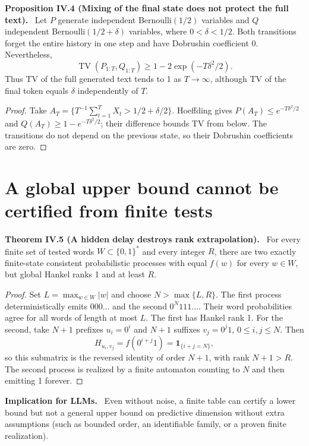 \documentclass[11pt,a4paper,oneside]{book}
\newcommand{\one}{\mathbf 1}\newcommand{\ii}{\mathrm i}\newcommand{\dd}{\mathrm d}
\newcommand{\statement}[3]{\par\medskip\noindent\textbf{#1 #2 (#3).}\ }
\newcommand{\note}[1]{\par\medskip\noindent\textbf{#1}\ }
\begin{document}
\statement{Proposition}{IV.4}{Mixing of the final state does not protect the full text} Let $P$ generate independent Bernoulli$(1/2)$ variables and $Q$ independent Bernoulli$(1/2+\delta)$ variables, where $0<\delta<1/2$. Both transitions forget the entire history in one step and have Dobrushin coefficient 0. Nevertheless,
\begin{equation}\operatorname{TV}(P_{1:T},Q_{1:T})\ge1-2\exp(-T\delta^2/2).\tag{35}\end{equation}
Thus TV of the full generated text tends to 1 as $T\to\infty$, although TV of the final token equals $\delta$ independently of $T$.
\begin{proof}Take $A_T=\{T^{-1}\sum_{t=1}^TX_t>1/2+\delta/2\}$. Hoeffding gives $P(A_T)\le e^{-T\delta^2/2}$ and $Q(A_T)\ge1-e^{-T\delta^2/2}$; their difference bounds TV from below. The transitions do not depend on the previous state, so their Dobrushin coefficients are zero.\end{proof}
\section*{A global upper bound cannot be certified from finite tests}
\statement{Theorem}{IV.5}{A hidden delay destroys rank extrapolation} For every finite set of tested words $W\subset\{0,1\}^*$ and every integer $R$, there are two exactly finite-state consistent probabilistic processes with equal $f(w)$ for every $w\in W$, but global Hankel ranks 1 and at least $R$.
\begin{proof}Set $L=\max_{w\in W}|w|$ and choose $N>\max\{L,R\}$. The first process deterministically emits $000\ldots$ and the second $0^N111\ldots$. Their word probabilities agree for all words of length at most $L$. The first has Hankel rank 1. For the second, take $N+1$ prefixes $u_i=0^i$ and $N+1$ suffixes $v_j=0^j1$, $0\le i,j\le N$. Then
\[H_{u_i,v_j}=f(0^{i+j}1)=\one_{\{i+j=N\}},\]
so this submatrix is the reversed identity of order $N+1$, with rank $N+1>R$. The second process is realized by a finite automaton counting to $N$ and then emitting 1 forever.\end{proof}
\note{Implication for LLMs.} Even without noise, a finite table can certify a lower bound but not a general upper bound on predictive dimension without extra assumptions (such as bounded order, an identifiable family, or a proven finite realization).
\end{document}
